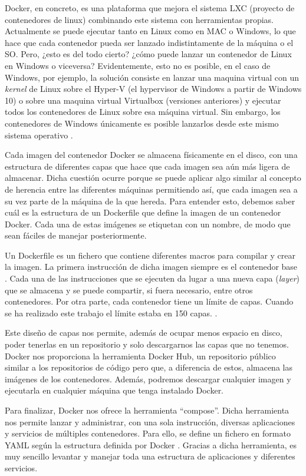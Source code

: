 Docker, en concreto, es una plataforma que mejora el sistema LXC (proyecto
de contenedores de linux) combinando este sistema con herramientas propias.
Actualmente se puede ejecutar tanto en Linux como en MAC o Windows, lo que
hace que cada contenedor pueda ser lanzado indistintamente de la máquina o
el SO. Pero, ¿esto es del todo cierto? ¿cómo puede lanzar un contenedor de
Linux en Windows o viceversa? Evidentemente, esto no es posible, en el caso
de Windows, por ejemplo, la solución consiste en lanzar una maquina virtual
con un \emph{kernel} de Linux sobre el Hyper-V (el hypervisor de Windows a partir
de Windows 10) o sobre una maquina virtual Virtualbox (versiones
anteriores) y ejecutar todos los contenedores de Linux sobre esa máquina
virtual. Sin embargo, los contenedores de Windows únicamente es posible
lanzarlos desde este mismo sistema operativo \cite{Dck-10}.

Cada imagen del contenedor Docker se almacena físicamente en el disco, con
una estructura de diferentes capas que hace que cada imagen sea aún más
ligera de almacenar. Dicha cuestión ocurre porque se puede aplicar algo
similar al concepto de herencia entre las diferentes máquinas permitiendo
así, que cada imagen sea a su vez parte de la máquina de la que hereda.
Para entender esto, debemos saber cuál es la estructura de un Dockerfile
que define la imagen de un contenedor Docker. Cada una de estas imágenes se
etiquetan con un nombre, de modo que sean fáciles de manejar posteriormente.

Un Dockerfile es un fichero que contiene diferentes macros para compilar y
crear la imagen. La primera instrucción de dicha imagen siempre es el
contenedor base \cite{Dck-11}. Cada una de las instrucciones que se
ejecuten da lugar a una nueva capa (\emph{layer}) que se almacena y se puede
compartir, si fuera necesario, entre otros contenedores. Por otra parte,
cada contenedor tiene un límite de capas. Cuando se ha realizado este trabajo
el límite estaba en 150 capas. \cite{Dck-12}.

Este diseño de capas nos permite, además de ocupar menos espacio en disco,
poder tenerlas en un repositorio y solo descargarnos las capas que no
tenemos. Docker nos proporciona la herramienta Docker Hub, un repositorio
público similar a los repositorios de código pero que, a diferencia de
estos, almacena las imágenes de los contenedores. Además, podremos
descargar cualquier imagen y ejecutarla en cualquier máquina que tenga
instalado Docker.

Para finalizar, Docker nos ofrece la herramienta ``compose''. Dicha
herramienta nos permite lanzar y administrar, con una sola instrucción,
diversas aplicaciones y servicios de múltiples contenedores. Para ello, se
define un fichero en formato YAML según la estructura definida por Docker
\cite{Dck-13}. Gracias a dicha herramienta, es muy sencillo levantar y
manejar toda una estructura de aplicaciones y diferentes servicios.



